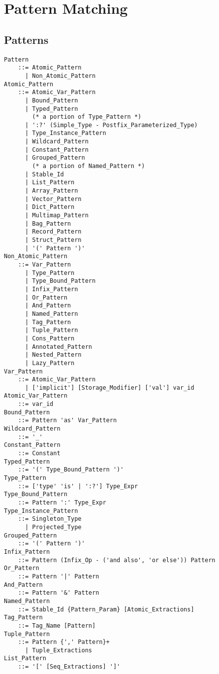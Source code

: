 
\chapter{Pattern Matching}
\label{sec:pattern-matching}

\minitoc

\newpage




\section{Patterns}
\label{sec:patterns}

\grammar\begin{lstlisting}
Pattern
    ::= Atomic_Pattern
      | Non_Atomic_Pattern
Atomic_Pattern 
    ::= Atomic_Var_Pattern
      | Bound_Pattern
      | Typed_Pattern
        (* a portion of Type_Pattern *)
      | ':?' (Simple_Type - Postfix_Parameterized_Type)  
      | Type_Instance_Pattern
      | Wildcard_Pattern
      | Constant_Pattern
      | Grouped_Pattern
        (* a portion of Named_Pattern *)
      | Stable_Id  
      | List_Pattern
      | Array_Pattern
      | Vector_Pattern
      | Dict_Pattern
      | Multimap_Pattern
      | Bag_Pattern
      | Record_Pattern
      | Struct_Pattern
      | '(' Pattern ')'
Non_Atomic_Pattern 
    ::= Var_Pattern
      | Type_Pattern
      | Type_Bound_Pattern
      | Infix_Pattern
      | Or_Pattern
      | And_Pattern
      | Named_Pattern
      | Tag_Pattern
      | Tuple_Pattern
      | Cons_Pattern
      | Annotated_Pattern
      | Nested_Pattern
      | Lazy_Pattern
Var_Pattern 
    ::= Atomic_Var_Pattern
      | ['implicit'] [Storage_Modifier] ['val'] var_id
Atomic_Var_Pattern 
    ::= var_id
Bound_Pattern 
    ::= Pattern 'as' Var_Pattern
Wildcard_Pattern 
    ::= '_'
Constant_Pattern 
    ::= Constant
Typed_Pattern 
    ::= '(' Type_Bound_Pattern ')'
Type_Pattern 
    ::= ['type' 'is' | ':?'] Type_Expr
Type_Bound_Pattern 
    ::= Pattern ':' Type_Expr
Type_Instance_Pattern 
    ::= Singleton_Type
      | Projected_Type
Grouped_Pattern 
    ::= '(' Pattern ')'
Infix_Pattern 
    ::= Pattern (Infix_Op - ('and also', 'or else')) Pattern
Or_Pattern 
    ::= Pattern '|' Pattern
And_Pattern 
    ::= Pattern '&' Pattern
Named_Pattern 
    ::= Stable_Id {Pattern_Param} [Atomic_Extractions]
Tag_Pattern
    ::= Tag_Name [Pattern]
Tuple_Pattern 
    ::= Pattern {',' Pattern}+
      | Tuple_Extractions
List_Pattern
    ::= '[' [Seq_Extractions] ']'

\end{lstlisting}

